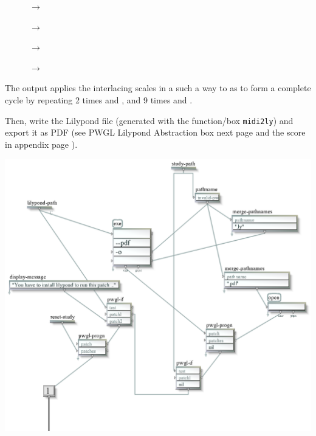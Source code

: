 \begin{description}
\item[ ] \textcolor{gray}{} $\rightarrow$ \textcolor{gray}{}
\item[ ] \textcolor{gray}{} $\rightarrow$ \textcolor{gray}{}
\item[ ] \textcolor{gray}{} $\rightarrow$ \textcolor{gray}{}
\item[ ] \textcolor{gray}{} $\rightarrow$ \textcolor{gray}{}
\end{description}

\smallskip

The output \textcolor{gray}{} applies the interlacing scales in a such a way to as to form a complete cycle by repeating 2 times \textcolor{gray}{} and \textcolor{gray}{}, and 9 times \textcolor{gray}{} and \textcolor{gray}{}.  

\bigskip

Then, \textcolor{gray}{} write the Lilypond file (generated with the function/box \texttt{midi2ly}) and export it as PDF (see PWGL Lilypond Abstraction box next page and the score in appendix page \pageref{clav}).

{
\begin{center}
\includegraphics[width=\textwidth]{mp/img/lilypond-abs}
\end{center}
\vspace{-6mm}
} 


